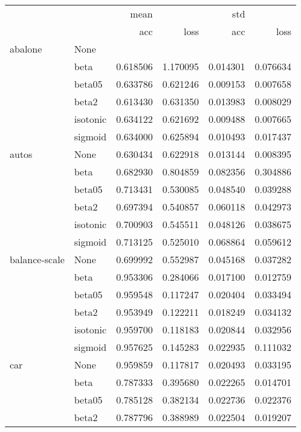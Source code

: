 \begin{tabular}{llrrrr}
\toprule
        &      &      mean &            &       std &           \\
        &      &       acc &       loss &       acc &      loss \\
\midrule
abalone & None &           &            &           &           \\
        & beta &  0.618506 &   1.170095 &  0.014301 &  0.076634 \\
        & beta05 &  0.633786 &   0.621246 &  0.009153 &  0.007658 \\
        & beta2 &  0.613430 &   0.631350 &  0.013983 &  0.008029 \\
        & isotonic &  0.634122 &   0.621692 &  0.009488 &  0.007665 \\
        & sigmoid &  0.634000 &   0.625894 &  0.010493 &  0.017437 \\
autos & None &  0.630434 &   0.622918 &  0.013144 &  0.008395 \\
        & beta &  0.682930 &   0.804859 &  0.082356 &  0.304886 \\
        & beta05 &  0.713431 &   0.530085 &  0.048540 &  0.039288 \\
        & beta2 &  0.697394 &   0.540857 &  0.060118 &  0.042973 \\
        & isotonic &  0.700903 &   0.545511 &  0.048126 &  0.038675 \\
        & sigmoid &  0.713125 &   0.525010 &  0.068864 &  0.059612 \\
balance-scale & None &  0.699992 &   0.552987 &  0.045168 &  0.037282 \\
        & beta &  0.953306 &   0.284066 &  0.017100 &  0.012759 \\
        & beta05 &  0.959548 &   0.117247 &  0.020404 &  0.033494 \\
        & beta2 &  0.953949 &   0.122211 &  0.018249 &  0.034132 \\
        & isotonic &  0.959700 &   0.118183 &  0.020844 &  0.032956 \\
        & sigmoid &  0.957625 &   0.145283 &  0.022935 &  0.111032 \\
car & None &  0.959859 &   0.117817 &  0.020493 &  0.033195 \\
        & beta &  0.787333 &   0.395680 &  0.022265 &  0.014701 \\
        & beta05 &  0.785128 &   0.382134 &  0.022736 &  0.022376 \\
        & beta2 &  0.787796 &   0.388989 &  0.022504 &  0.019207 \\

\end{tabular}
